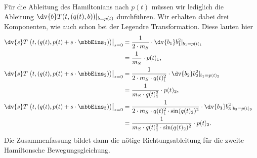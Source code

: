 \documentclass{subfiles}
\begin{document}
    Für die Ableitung des Hamiltonians nach $p(t)$ müssen wir lediglich die Ableitung $\dv{b}T(t,(q(t),b))|_{b = p(t)}$ durchführen. Wir erhalten dabei drei Komponenten, wie auch schon bei der Legendre Transformation. Diese lauten hier
    \begin{align*}
        \dv{s}T\left.\bigl(t,(q(t),p(t) + s\cdot\mbbEins_1)\bigr)\right|_{s=0} &= \frac{1}{2\cdot m_S}\cdot\dv{b_1}b_1^2|_{b_1 = p(t)_1} \\
        &= \frac{1}{m_S}\cdot p(t)_1, \\
        \dv{s}T\left.\bigl(t,(q(t),p(t) + s\cdot\mbbEins_2)\bigr)\right|_{s=0} &= \frac{1}{2\cdot m_S\cdot q(t)_1^2}\cdot\dv{b_2}b_2^2|_{b_2 = p(t)_2} \\
        &= \frac{1}{m_S\cdot q(t)_1^2}\cdot p(t)_2, \\
        \dv{s}T\left.\bigl(t,(q(t),p(t) + s\cdot\mbbEins_3)\bigr)\right|_{s=0} &= \frac{1}{2\cdot m_S\cdot q(t)_1^2\cdot\sin(q(t)_2)^2}\cdot\dv{b_3}b_3^2|_{b_3 = p(t)_3} \\
        &= \frac{1}{m_S\cdot q(t)_1^2\cdot\sin(q(t)_2)^2}\cdot p(t)_3.
    \end{align*}
    Die Zusammenfassung bildet dann die nötige Richtungsableitung für die zweite Hamiltonsche Bewegungsgleichung. 
\end{document}

